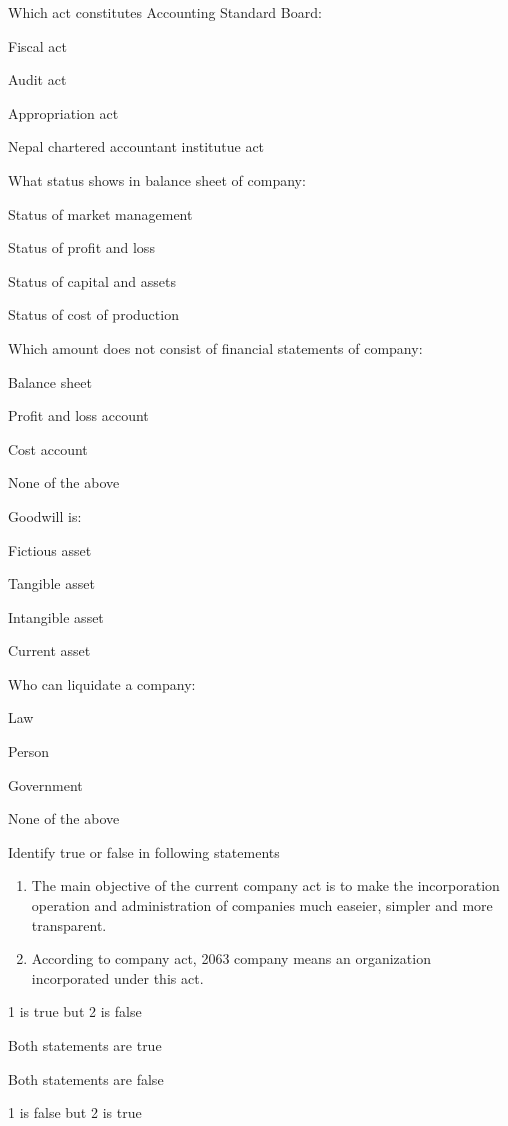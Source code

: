 \begin{questions}
\question Which act constitutes Accounting Standard Board:
  \begin{items}
  \item Fiscal act
  \item Audit act
  \item Appropriation act
  \item Nepal chartered accountant institutue act
  \end{items}

\question What status shows in balance sheet of company:
  \begin{items}
  \item Status of market management
  \item Status of profit and loss
  \item Status of capital and assets
  \item Status of cost of production
  \end{items}

\question Which amount does not consist of financial statements of company:
  \begin{items}
  \item Balance sheet
  \item Profit and loss account
  \item Cost account
  \item None of the above
  \end{items}

\question Goodwill is:
  \begin{items}
  \item Fictious asset
  \item Tangible asset
  \item Intangible asset
  \item Current asset
  \end{items}

\question Who can liquidate a company:
  \begin{items}
  \item Law
  \item Person
  \item Government
  \item None of the above
  \end{items}

\question Identify true or false in following statements
  \begin{enumerate}
  \item The main objective of the current company act is to make the incorporation operation and administration of companies much easeier, simpler and more transparent.
  \item According to company act, 2063 company means an organization incorporated under this act.
  \end{enumerate}
  \begin{items}
  \item 1 is true but 2 is false
  \item Both statements are true
  \item Both statements are false
  \item 1 is false but 2 is true
  \end{items}


\end{questions}
